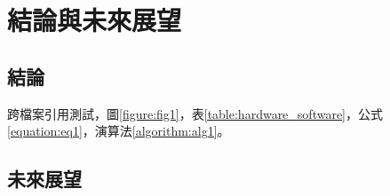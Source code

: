 \section{結論與未來展望}

\subsection{結論}
跨檔案引用測試，圖\ref{figure:fig1}，表\ref{table:hardware_software}，公式\ref{equation:eq1}，演算法\ref{algorithm:alg1}。

\subsection{未來展望}
